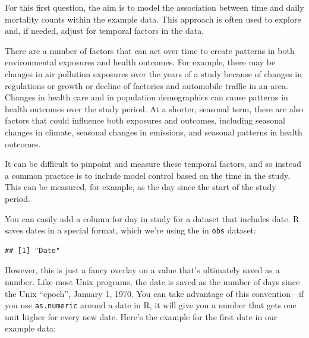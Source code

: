 \documentclass[
]{book}
\newenvironment{Shaded}{\begin{snugshade}}{\end{snugshade}}
\newcommand{\DecValTok}[1]{\textcolor[rgb]{0.00,0.00,0.81}{#1}}
\newcommand{\FunctionTok}[1]{\textcolor[rgb]{0.00,0.00,0.00}{#1}}
\newcommand{\NormalTok}[1]{#1}
\newcommand{\SpecialCharTok}[1]{\textcolor[rgb]{0.00,0.00,0.00}{#1}}
\begin{document}
For this first question, the aim is to model the association between time and
daily mortality counts within the example data. This approach is often used
to explore and, if needed, adjust for temporal factors in the data.

There are a number of factors that can act over time to create patterns in both
environmental exposures and health outcomes. For example, there may be changes
in air pollution exposures over the years of a study because of changes in
regulations or growth or decline of factories and automobile traffic in an area.
Changes in health care and in population demographics can cause patterns in
health outcomes over the study period. At a shorter, seasonal term, there are
also factors that could influence both exposures and outcomes, including
seasonal changes in climate, seasonal changes in emissions, and seasonal
patterns in health outcomes.

It can be difficult to pinpoint and measure these temporal factors, and so
instead a common practice is to include model control based on the time in the
study. This can be measured, for example, as the day since the start of the
study period.

You can easily add a column for day in study for a dataset that
includes date. R saves dates in a special format, which we're using the in
\texttt{obs} dataset:

\begin{Shaded}
\end{Shaded}

\begin{verbatim}
## [1] "Date"
\end{verbatim}

However, this is just a fancy overlay on a value that's ultimately saved as
a number. Like most Unix programs, the date is saved as the number of days
since the Unix ``epoch'', January 1, 1970. You can take advantage of this
convention---if you use \texttt{as.numeric} around a date in R, it will give you a
number that gets one unit higher for every new date. Here's the example for
the first date in our example data:

\begin{Shaded}
\end{Shaded}
\end{document}
